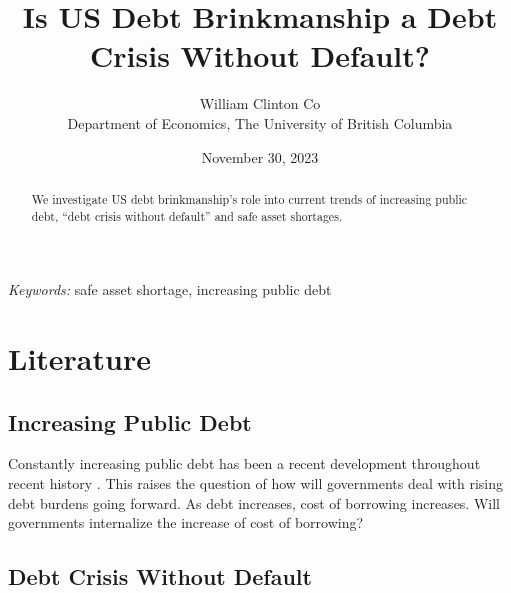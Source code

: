 \documentclass[
  12pt]{article}
\begin{document}
\def\spacingset#1{\renewcommand{\baselinestretch}%
{#1}\small\normalsize} \spacingset{1}



\date{November 30, 2023}
\title{\bf Is US Debt Brinkmanship a Debt Crisis Without Default?}
\author{
William Clinton Co\\
Department of Economics, The University of British Columbia\\
}
\maketitle

\bigskip
\bigskip
\begin{abstract}
We investigate US debt brinkmanship's role into current trends of
increasing public debt, ``debt crisis without default'' and safe asset
shortages.
\end{abstract}

\noindent%
{\it Keywords:} safe asset shortage, increasing public debt
\vfill

\newpage
\spacingset{1.9} %
\ifdefined\Shaded\renewenvironment{Shaded}{\begin{tcolorbox}[breakable, enhanced, frame hidden, interior hidden, sharp corners, boxrule=0pt, borderline west={3pt}{0pt}{shadecolor}]}{\end{tcolorbox}}\fi

\hypertarget{sec-l}{%
\section{Literature}\label{sec-l}}

\hypertarget{increasing-public-debt}{%
\subsection{Increasing Public Debt}\label{increasing-public-debt}}

Constantly increasing public debt has been a recent development
throughout recent history \citep{mitchener2023}. This raises the
question of how will governments deal with rising debt burdens going
forward. As debt increases, cost of borrowing increases. Will
governments internalize the increase of cost of borrowing?

\hypertarget{debt-crisis-without-default}{%
\subsection{Debt Crisis Without
Default}\label{debt-crisis-without-default}}
\end{document}
